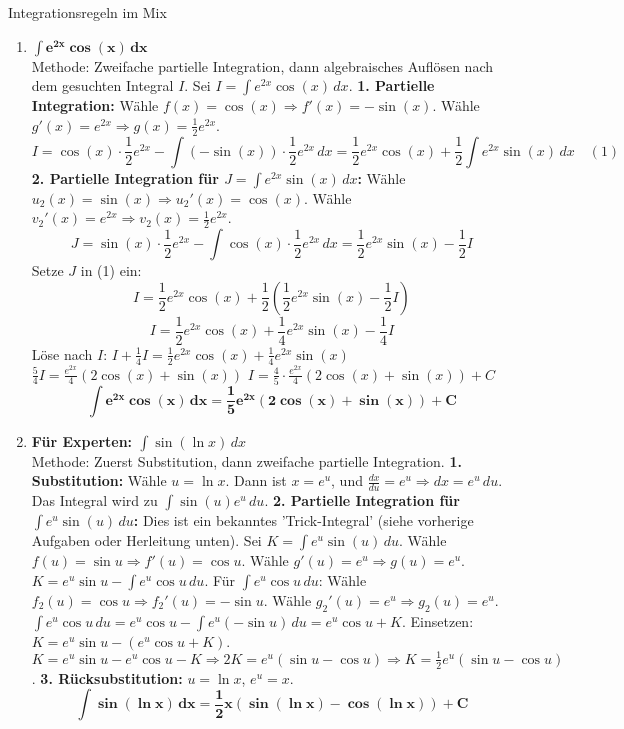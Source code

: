 \begin{loesungsumgebung}{Integrationsregeln im Mix}
\begin{enumerate}[label=(\alph*)]
    \item $\mathbf{\int e^{2x} \cos(x) \,dx}$ \\
    Methode: Zweifache partielle Integration, dann algebraisches Auflösen nach dem gesuchten Integral $I$.
    Sei $I = \int e^{2x} \cos(x) \,dx$.
    \textbf{1. Partielle Integration:} Wähle $f(x)=\cos(x) \Rightarrow f'(x)=-\sin(x)$. Wähle $g'(x)=e^{2x} \Rightarrow g(x)=\frac{1}{2}e^{2x}$.
    $$ I = \cos(x) \cdot \frac{1}{2}e^{2x} - \int (-\sin(x)) \cdot \frac{1}{2}e^{2x} \,dx = \frac{1}{2}e^{2x}\cos(x) + \frac{1}{2} \int e^{2x}\sin(x) \,dx \quad (1) $$
    \textbf{2. Partielle Integration für $J = \int e^{2x}\sin(x) \,dx$:}
    Wähle $u_2(x)=\sin(x) \Rightarrow u_2'(x)=\cos(x)$. Wähle $v_2'(x)=e^{2x} \Rightarrow v_2(x)=\frac{1}{2}e^{2x}$.
    $$ J = \sin(x) \cdot \frac{1}{2}e^{2x} - \int \cos(x) \cdot \frac{1}{2}e^{2x} \,dx = \frac{1}{2}e^{2x}\sin(x) - \frac{1}{2}I $$
    Setze $J$ in (1) ein:
    $$ I = \frac{1}{2}e^{2x}\cos(x) + \frac{1}{2}\left(\frac{1}{2}e^{2x}\sin(x) - \frac{1}{2}I\right) $$
    $$ I = \frac{1}{2}e^{2x}\cos(x) + \frac{1}{4}e^{2x}\sin(x) - \frac{1}{4}I $$
    Löse nach $I$:
    $I + \frac{1}{4}I = \frac{1}{2}e^{2x}\cos(x) + \frac{1}{4}e^{2x}\sin(x)$
    $\frac{5}{4}I = \frac{e^{2x}}{4}(2\cos(x) + \sin(x))$
    $I = \frac{4}{5} \cdot \frac{e^{2x}}{4}(2\cos(x) + \sin(x)) + C$
    $$ \mathbf{\int e^{2x} \cos(x) \,dx = \frac{1}{5}e^{2x}(2\cos(x) + \sin(x)) + C} $$

    \item \textbf{Für Experten: $\int \sin(\ln x) \,dx$} \\
    Methode: Zuerst Substitution, dann zweifache partielle Integration.
    \textbf{1. Substitution:} Wähle $u = \ln x$. Dann ist $x = e^u$, und $\frac{dx}{du} = e^u \Rightarrow dx = e^u \,du$.
    Das Integral wird zu $\int \sin(u) e^u \,du$.
    \textbf{2. Partielle Integration für $\int e^u \sin(u) \,du$:}
    Dies ist ein bekanntes 'Trick-Integral' (siehe vorherige Aufgaben oder Herleitung unten).
    Sei $K = \int e^u \sin(u) \,du$.
    Wähle $f(u)=\sin u \Rightarrow f'(u)=\cos u$. Wähle $g'(u)=e^u \Rightarrow g(u)=e^u$.
    $K = e^u \sin u - \int e^u \cos u \,du$.
    Für $\int e^u \cos u \,du$: Wähle $f_2(u)=\cos u \Rightarrow f_2'(u)=-\sin u$. Wähle $g_2'(u)=e^u \Rightarrow g_2(u)=e^u$.
    $\int e^u \cos u \,du = e^u \cos u - \int e^u (-\sin u) \,du = e^u \cos u + K$.
    Einsetzen: $K = e^u \sin u - (e^u \cos u + K)$.
    $K = e^u \sin u - e^u \cos u - K \Rightarrow 2K = e^u(\sin u - \cos u) \Rightarrow K = \frac{1}{2}e^u(\sin u - \cos u)$.
    \textbf{3. Rücksubstitution:} $u=\ln x$, $e^u=x$.
    $$ \mathbf{\int \sin(\ln x) \,dx = \frac{1}{2}x(\sin(\ln x) - \cos(\ln x)) + C} $$


\end{enumerate}
\end{loesungsumgebung}

